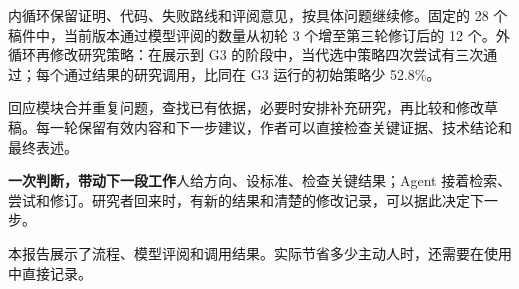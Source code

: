 内循环保留证明、代码、失败路线和评阅意见，按具体问题继续修。固定的 28 个稿件中，当前版本通过模型评阅的数量从初轮 3 个增至第三轮修订后的 12 个。外循环再修改研究策略：在展示到 G3 的阶段中，当代选中策略四次尝试有三次通过；每个通过结果的研究调用，比同在 G3 运行的初始策略少 52.8\%。

回应模块合并重复问题，查找已有依据，必要时安排补充研究，再比较和修改草稿。每一轮保留有效内容和下一步建议，作者可以直接检查关键证据、技术结论和最终表述。

\begin{insight}
\textbf{一次判断，带动下一段工作}\quad 人给方向、设标准、检查关键结果；Agent 接着检索、尝试和修订。研究者回来时，有新的结果和清楚的修改记录，可以据此决定下一步。
\end{insight}

\noindent 本报告展示了流程、模型评阅和调用结果。实际节省多少主动人时，还需要在使用中直接记录。
